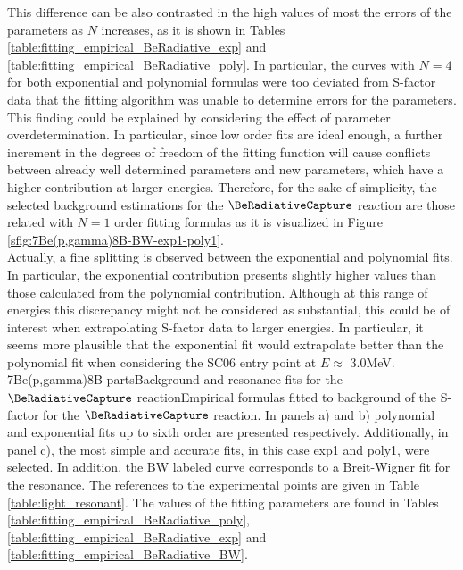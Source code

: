 \documentclass[openany]{book}
\begin{document}
This difference can be also contrasted in the high values of most the errors of the parameters as $N$ increases, as it is shown in Tables \ref{table:fitting_empirical_BeRadiative_exp} and \ref{table:fitting_empirical_BeRadiative_poly}. In particular, the curves with $N = 4$ for both exponential and polynomial formulas were too deviated from S-factor data that the fitting algorithm was unable to determine errors for the parameters.   \\

This finding could be explained by considering the effect of parameter overdetermination. In particular, since low order fits are ideal enough, a further increment in the degrees of freedom of the fitting function will cause conflicts between already well determined parameters and new parameters, which have a higher contribution at larger energies. Therefore, for the sake of simplicity, the selected background estimations for the $\BeRadiativeCapture$ reaction are those related with $N = 1$ order fitting formulas as it is visualized in Figure \ref{sfig:7Be(p,gamma)8B-BW-exp1-poly1}. \\

Actually, a fine splitting is observed between the exponential and polynomial fits. In particular, the exponential contribution presents slightly higher values than those calculated from the polynomial contribution. Although at this range of energies this discrepancy might not be considered as substantial, this could be of interest when extrapolating S-factor data to larger energies. In particular, it seems more plausible that the exponential fit would extrapolate better than the polynomial fit when considering the SC06 entry point at $E \approx$ 3.0MeV. \\

{7Be(p,gamma)8B-parts}{Background and resonance fits for the $\BeRadiativeCapture$ reaction}{Empirical formulas fitted to background of the S-factor for the $\BeRadiativeCapture$ reaction. In panels a) and b) polynomial and exponential fits up to sixth order are presented respectively. Additionally, in panel c), the most simple and accurate fits, in this case exp1 and poly1, were selected. In addition, the BW labeled curve corresponds to a Breit-Wigner fit for the resonance.  The references to the experimental points are given in Table \ref{table:light_resonant}. The values of the fitting parameters are found in Tables \ref{table:fitting_empirical_BeRadiative_poly}, \ref{table:fitting_empirical_BeRadiative_exp} and  \ref{table:fitting_empirical_BeRadiative_BW}.}
\end{document}
